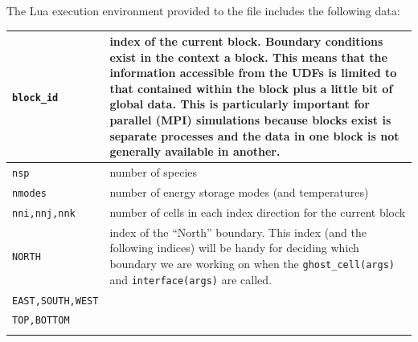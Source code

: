 \medskip
The Lua execution environment provided to the file includes the following data:\\
\vspace{1mm}
\begin{tabular}{ll} 
 \hline \noalign{\smallskip}
 \texttt{block\_id} & \parbox{10cm}{index of the current block. 
                                   Boundary conditions exist in the context a block.
                                   This means that the information accessible from the UDFs is limited
                                   to that contained within the block plus a little bit of global data.
                                   This is particularly important for parallel (MPI) simulations
                                   because blocks exist is separate processes and the data in one
                                   block is not generally available in another.} \\ \hline
 \texttt{nsp} & number of species \\
 \texttt{nmodes} & number of energy storage modes (and temperatures) \\
 \texttt{nni,nnj,nnk} &  number of cells in each index direction for the current block \\
 \noalign{\smallskip} \hline \noalign{\smallskip}
 \texttt{NORTH} & \parbox{10cm}{index of the ``North'' boundary.
                               This index (and the following indices) will be handy for deciding which boundary we are
                               working on when the \texttt{ghost\_cell(args)} and \texttt{interface(args)} 
                               are called.}\\
 \texttt{EAST,SOUTH,WEST} &  \\
 \texttt{TOP,BOTTOM} &  \\
 \noalign{\smallskip} \hline \noalign{\smallskip}
\end{tabular}

